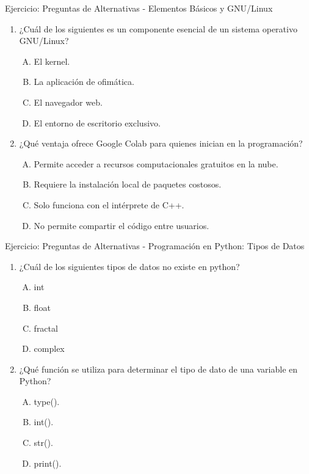 \documentclass[10pt]{beamer}
\begin{document}
\begin{frame}{Ejercicio: Preguntas de Alternativas - Elementos Básicos y GNU/Linux} 
    \begin{enumerate} 
        \item ¿Cuál de los siguientes es un componente esencial de un sistema operativo GNU/Linux? 
        \begin{enumerate}[A)] 
            \item El kernel. 
            \item La aplicación de ofimática. 
            \item El navegador web. 
            \item El entorno de escritorio exclusivo. 
        \end{enumerate} 
        \item ¿Qué ventaja ofrece Google Colab para quienes inician en la programación? 
        \begin{enumerate}[A)] 
            \item Permite acceder a recursos computacionales gratuitos en la nube. 
            \item Requiere la instalación local de paquetes costosos. 
            \item Solo funciona con el intérprete de C++. 
            \item No permite compartir el código entre usuarios. 
        \end{enumerate} 
    \end{enumerate} 
\end{frame}

\begin{frame}{Ejercicio: Preguntas de Alternativas - Programación en Python: Tipos de Datos} 
    \begin{enumerate} 
        \item ¿Cuál de los siguientes tipos de datos no existe en python? 
        \begin{enumerate}[A)] 
            \item int
            \item float
            \item fractal 
            \item complex 
        \end{enumerate} 
        \item ¿Qué función se utiliza para determinar el tipo de dato de una variable en Python? 
        \begin{enumerate}[A)] 
            \item type(). 
            \item int(). 
            \item str(). 
            \item print(). 
        \end{enumerate} 
    \end{enumerate}
\end{frame}
\end{document}
